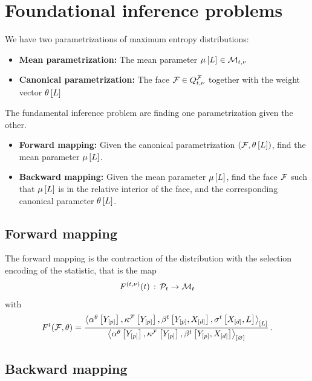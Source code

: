 \section{Foundational inference problems}

We have two parametrizations of maximum entropy distributions:
\begin{itemize}
    \item {\bf Mean parametrization:} The mean parameter $\mu\left[L\right]\in\mathcal{M}_{t,\nu}$
    \item {\bf Canonical parametrization:} The face $\mathcal{F}\in Q^{\mathcal{F}}_{t,\nu}$ together with the weight vector $\theta\left[L\right]$
\end{itemize}
The fundamental inference problem are finding one parametrization given the other.
\begin{itemize}
    \item {\bf Forward mapping:} Given the canonical parametrization $(\mathcal{F},\theta\left[L\right])$, find the mean parameter $\mu\left[L\right]$.
    \item {\bf Backward mapping:} Given the mean parameter $\mu\left[L\right]$, find the face $\mathcal{F}$ such that $\mu\left[L\right]$ is in the relative interior of the face, and the corresponding canonical parameter $\theta\left[L\right]$.
\end{itemize}

\subsection{Forward mapping}

The forward mapping is the contraction of the distribution with the selection encoding of the statistic, that is the map
\begin{align*}
    F^{(t,\nu)}(t) \,:\, \mathcal{P}_{t} \rightarrow \mathcal{M}_{t}
\end{align*}
with
\begin{align*} %
    \forwardmapwrtof{\sstat}{\facesymbol,\weightparam}
    = \frac{\contractionof{\softacttensorwith,\kcoreofat{\facesymbol}{\headvariables},\bencsstatwith,\sencsstatwith}{\selvariable}}{
        \contraction{\softacttensorwith,\kcoreofat{\facesymbol}{\headvariables},\bencsstatwith}
    } \, .
\end{align*}

\subsection{Backward mapping}

